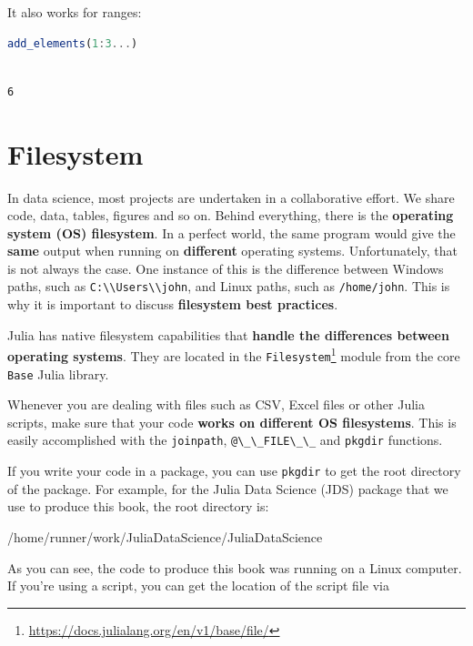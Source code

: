 \documentclass[
  notoc %
]{tufte-book}
\DeclareRobustCommand{\href}[2]{#2\footnote{\url{#1}}}
\newcommand{\passthrough}[1]{#1}
\begin{document}
It also works for ranges:

\begin{lstlisting}[language=Julia]
add_elements(1:3...)
\end{lstlisting}

\begin{lstlisting}[language=Output]

6

\end{lstlisting}

\hypertarget{sec:filesystem}{%
\section{Filesystem}\label{sec:filesystem}}

In data science, most projects are undertaken in a collaborative effort.
We share code, data, tables, figures and so on. Behind everything, there
is the \textbf{operating system (OS) filesystem}. In a perfect world,
the same program would give the \textbf{same} output when running on
\textbf{different} operating systems. Unfortunately, that is not always
the case. One instance of this is the difference between Windows paths,
such as \passthrough{\lstinline!C:\\Users\\john!}, and Linux paths, such
as \passthrough{\lstinline!/home/john!}. This is why it is important to
discuss \textbf{filesystem best practices}.

Julia has native filesystem capabilities that \textbf{handle the
differences between operating systems}. They are located in the
\href{https://docs.julialang.org/en/v1/base/file/}{\passthrough{\lstinline!Filesystem!}}
module from the core \passthrough{\lstinline!Base!} Julia library.

Whenever you are dealing with files such as CSV, Excel files or other
Julia scripts, make sure that your code \textbf{works on different OS
filesystems}. This is easily accomplished with the
\passthrough{\lstinline!joinpath!},
\passthrough{\lstinline!@\_\_FILE\_\_!} and
\passthrough{\lstinline!pkgdir!} functions.

If you write your code in a package, you can use
\passthrough{\lstinline!pkgdir!} to get the root directory of the
package. For example, for the Julia Data Science (JDS) package that we
use to produce this book, the root directory is:

/home/runner/work/JuliaDataScience/JuliaDataScience

As you can see, the code to produce this book was running on a Linux
computer. If you're using a script, you can get the location of the
script file via
\end{document}
